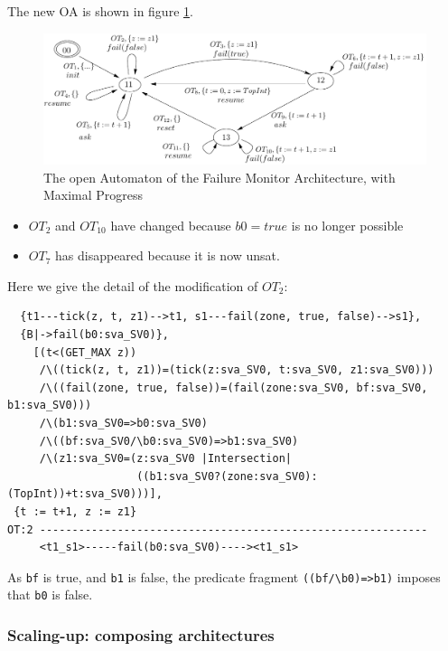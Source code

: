 \documentclass{llncs}
\begin{document}
  The new OA is shown in figure \ref{schema:ArchFailure:OA-MaxProgress}.

  \begin{figure}[t]
  \centering
  \includegraphics[width=\columnwidth]{TimerOAMaxProgress}
  \caption{The open Automaton of the Failure Monitor Architecture,
    with Maximal Progress}
  \label{schema:ArchFailure:OA-MaxProgress}
\end{figure}

\begin{itemize}
\item $OT_2$ and $OT_{10}$ have changed because $b0=true$ is no longer possible
\item $OT_7$ has disappeared because it is now unsat.
\end{itemize}

  Here we give the detail of the modification of $OT_2$:

\begin{verbatim}
  {t1---tick(z, t, z1)-->t1, s1---fail(zone, true, false)-->s1},
  {B|->fail(b0:sva_SV0)},
    [(t<(GET_MAX z))
     /\((tick(z, t, z1))=(tick(z:sva_SV0, t:sva_SV0, z1:sva_SV0)))
     /\((fail(zone, true, false))=(fail(zone:sva_SV0, bf:sva_SV0, b1:sva_SV0)))
     /\(b1:sva_SV0=>b0:sva_SV0)
     /\((bf:sva_SV0/\b0:sva_SV0)=>b1:sva_SV0)
     /\(z1:sva_SV0=(z:sva_SV0 |Intersection|
                    ((b1:sva_SV0?(zone:sva_SV0):(TopInt))+t:sva_SV0)))],
 {t := t+1, z := z1}
OT:2 ------------------------------------------------------------
     <t1_s1>-----fail(b0:sva_SV0)----><t1_s1>
\end{verbatim}

As \verb|bf| is true, and \verb|b1| is false, the predicate fragment
\verb|((bf/\b0)=>b1)| imposes that \verb|b0| is false.

\subsubsection{Scaling-up: composing architectures}

\medskip
\end{document}
